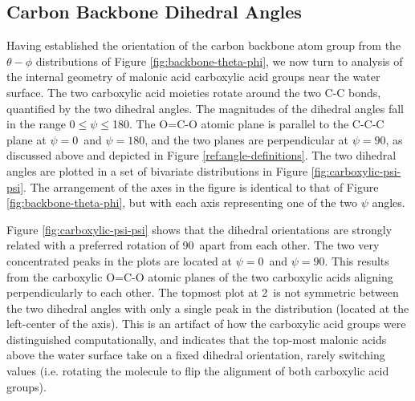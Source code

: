 \subsection {Carbon Backbone Dihedral Angles}

Having established the orientation of the carbon backbone atom group from the $\theta-\phi$ distributions of Figure \ref{fig:backbone-theta-phi}, we now turn to analysis of the  internal geometry of malonic acid carboxylic acid groups near the water surface. The two carboxylic acid moieties rotate around the two C-C bonds, quantified by the two dihedral angles. The magnitudes of the dihedral angles fall in the range 0\textdegree$\le \psi \le$180\textdegree. The O=C-O atomic plane is parallel to the C-C-C plane at $\psi=0$\textdegree~and $\psi=180$\textdegree, and the two planes are perpendicular at $\psi=90$\textdegree, as discussed above and depicted in Figure \ref{ref:angle-definitions}. The two dihedral angles are plotted in a set of bivariate distributions in Figure \ref{fig:carboxylic-psi-psi}. The arrangement of the axes in the figure is identical to that of Figure \ref{fig:backbone-theta-phi}, but with each axis representing one of the two $\psi$ angles.

Figure \ref{fig:carboxylic-psi-psi} shows that the dihedral orientations are strongly related with a preferred rotation of 90\textdegree~apart from each other. The two very concentrated peaks in the plots are located at $\psi=0$\textdegree~and $\psi=90$\textdegree. This results from the carboxylic O=C-O atomic planes of the two carboxylic acids aligning perpendicularly to each other. The topmost plot at 2\angs~is not symmetric between the two dihedral angles with only a single peak in the distribution (located at the left-center of the axis). This is an artifact of how the carboxylic acid groups were distinguished computationally, and indicates that the top-most malonic acids above the water surface take on a fixed dihedral orientation, rarely switching values (i.e. rotating the molecule to flip the alignment of both carboxylic acid groups).


